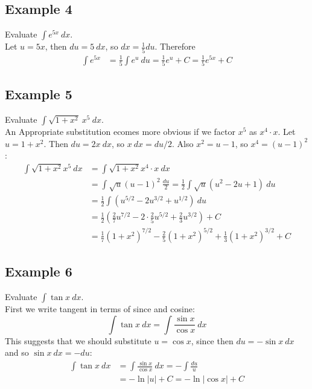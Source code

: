 \documentclass[11pt]{article}
\begin{document}
\pagebreak
\subsection{Example 4}
Evaluate $ \displaystyle{\int e^{5x}\ dx} $.
\\[8pt]
Let $ u=5x $, then $ du=5\ dx $, so $ dx = \frac{1}{5}du $. Therefore
\begin{align*}
    \int e^{5x} &= \frac{1}{5}\int e^u \ du = \frac{1}{5}e^u + C = \frac{1}{5}e^{5x} + C
\end{align*}

\subsection{Example 5}
Evaluate $ \displaystyle{\int \sqrt{1+x^2}\ x^5\ dx} $.
\\[8pt]
An Appropriate substitution ecomes more obvious if we factor $ x^5 $ as $ x^4 \cdot x $. Let $ u = 1+x^2 $. Then $ du = 2x\ dx $, so $ x\ dx = du/2 $. Also $ x^2 = u - 1 $, so $ x^4 = (u-1)^2 $:
\begin{align*}
    \int \sqrt{1+x^2}x^5\ dx
    &= \int \sqrt{1+x^2}x^4\cdot x\ dx\\
    &= \int \sqrt{u} (u-1)^2\ \frac{du}{2}
    =  \frac{1}{2}\int \sqrt{u}(u^2 - 2u +1)\ du\\
    &= \frac{1}{2}\int (u^{5/2} - 2u^{3/2} + u^{1/2})\ du\\
    &= \frac{1}{2}(\frac{2}{7}u^{7/2} - 2\cdot \frac{2}{5}u^{5/2} + \frac{2}{3}u^{3/2}) + C\\
    &= \frac{1}{7}(1+x^2)^{7/2} - \frac{2}{5}(1+x^2)^{5/2} + \frac{1}{3}(1+x^2)^{3/2} + C
\end{align*}

\subsection{Example 6}
Evaluate $ \displaystyle{\int \tan x\ dx} $.
\\[8pt]
First we write tangent in terms of since and cosine:\[
    \int \tan x\ dx = \int \frac{\sin x}{\cos x}\ dx
\]
This suggests that we should substitute $ u = \cos x $, since then $ du = -\sin x\ dx $ and so $ \sin x\ dx = -du $:
\begin{align*}
    \int \tan x\ dx
    &= \int \frac{\sin x }{\cos x}\ dx = -\int \frac{du}{u}\\
    &= -\ln |u| + C = -\ln|\cos x| + C
\end{align*}
\end{document}
